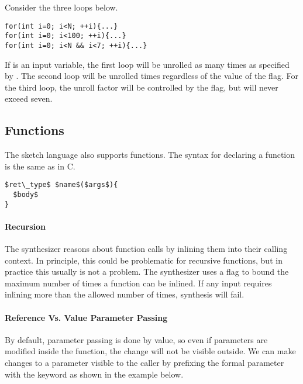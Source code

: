 \begin{Example}
Consider the three loops below.
\begin{lstlisting}
for(int i=0; i<N; ++i){...}
for(int i=0; i<100; ++i){...}
for(int i=0; i<N && i<7; ++i){...}
\end{lstlisting}
If  is an input variable, the first loop will be unrolled as many times as specified by . The second loop will be unrolled  times regardless of the value of the flag. For the third loop, the unroll factor will be controlled by the flag, but will never exceed seven.
\end{Example}



\subsection{Functions}
The sketch language also supports functions. The syntax for declaring a function is the same as in C. 

\begin{lstlisting}
$ret\_type$ $name$($args$){
  $body$
}
\end{lstlisting}

\paragraph{Recursion}
The synthesizer reasons about function calls by inlining them into their calling context. In principle, this could be problematic for recursive functions, but in practice this usually is not a problem. The synthesizer uses a flag  to bound the maximum number of times a function can be inlined. If any input requires inlining more than the allowed number of times, synthesis will fail.



\paragraph{Reference Vs. Value Parameter Passing}
By default, parameter passing is done by value, so even if parameters are modified inside the function, the change will not be visible outside. We can make changes to a parameter visible to the caller by prefixing the formal parameter with the keyword  as shown in the example below.

